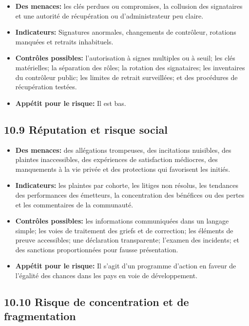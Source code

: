 \documentclass[11pt]{article}
\begin{document}
\begin{itemize}[leftmargin=*]
\item \textbf{Des menaces:} les clés perdues ou compromises, la collusion des signataires et une autorité de récupération ou d'administrateur peu claire.
\item \textbf{Indicateurs:} Signatures anormales, changements de contrôleur, rotations manquées et retraits inhabituels.
\item \textbf{Contrôles possibles:} l'autorisation à signes multiples ou à seuil; les clés matérielles; la séparation des rôles; la rotation des signataires; les inventaires du contrôleur public; les limites de retrait surveillées; et des procédures de récupération testées.
\item \textbf{Appétit pour le risque:} Il est bas.
\end{itemize}
\subsection*{10.9 Réputation et risque social}

\begin{itemize}[leftmargin=*]
\item \textbf{Des menaces:} des allégations trompeuses, des incitations nuisibles, des plaintes inaccessibles, des expériences de satisfaction médiocres, des manquements à la vie privée et des protections qui favorisent les initiés.
\item \textbf{Indicateurs:} les plaintes par cohorte, les litiges non résolus, les tendances des performances des émetteurs, la concentration des bénéfices ou des pertes et les commentaires de la communauté.
\item \textbf{Contrôles possibles:} les informations communiquées dans un langage simple; les voies de traitement des griefs et de correction; les éléments de preuve accessibles; une déclaration transparente; l'examen des incidents; et des sanctions proportionnées pour fausse présentation.
\item \textbf{Appétit pour le risque:} Il s'agit d'un programme d'action en faveur de l'égalité des chances dans les pays en voie de développement.
\end{itemize}
\subsection*{10.10 Risque de concentration et de fragmentation}
\end{document}
